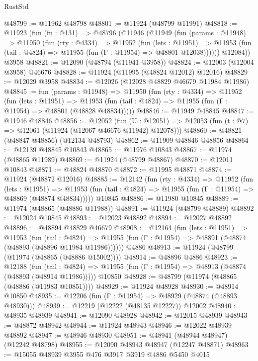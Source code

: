 \begin{lexlean}{RustStd}
\begin{coremodule}
{\begin{coremodule}
{{{{{{{{{{{{{{{{{{{{{{{{{{{{{{{{{{{{{{{{{{{{{{{{{{{{{{{{{{{{{{{{{{{{{{{{{{{{{{{{@48799 := @11962 @48798
@48801 := @11924 (@48799 @11991)
@48818 := @11923
    (fun (fn : @131) =>
    @48796
      (@11946
        (@11949
          (fun (params : @11948) =>
          @11950
            (fun (rty : @4334) =>
            @11952
              (fun (lets : @11951) =>
              @11953 (fun (tail : @4824) => @11955 (fun (Γ : @11954) => @48801 @12038))))))
        @12084))
    @3958
@48821 := @12090 (@48794 (@11941 @3958))
@48824 := @12003 (@12004 @3958) @46676
@48828 := @11924 (@11995 (@48824 @12012) @12016)
@48829 := @12029 @3958
@48834 := @12026 (@12028 @48829 @46679 @11984 @11986)
@48845 := fun (params : @11948) =>
  @11950
    (fun (rty : @4334) =>
    @11952
      (fun (lets : @11951) =>
      @11953 (fun (tail : @4824) => @11955 (fun (Γ : @11954) => @48801 (@48828 @48834)))))
@48846 := @11949 @48845
@48847 := @11946 @48846
@48856 := @12052
    (fun (U : @12051) => @12053 (fun (t : @7) => @12061 (@11924 (@12067 @46676 @11942) @12078)))
@48860 := @48821 (@48847 @48856) (@12134 @48793)
@48862 := @11909 @48846 @48856
@48864 := @12139 @48845 @10843
@48865 := @11976 @10843
@48867 := @11974 (@48865 @11989)
@48869 := @11924 (@48799 @48867)
@48870 := @12011 @10843
@48871 := @48824 @48870
@48872 := @11995 @48871
@48874 := @11924 (@48872 @12016)
@48885 := @12142
    (fun (rty : @4334) =>
    @11952
      (fun (lets : @11951) =>
      @11953 (fun (tail : @4824) => @11955 (fun (Γ : @11954) => @48869 (@48874 @48834)))))
    @10845
@48886 := @11980 @10845
@48889 := @11974 (@48865 (@48886 @11988))
@48891 := @11924 (@48799 @48889)
@48892 := @12024 @10845
@48893 := @12023 @48892
@48894 := @12027 @48892
@48896 := @48894 @48829 @46679
@48908 := @12164
    (fun (lets : @11951) =>
    @11953
      (fun (tail : @4824) =>
      @11955 (fun (Γ : @11954) => @48891 (@48874 (@48893 (@48896 @11984 @11986))))))
    @4886
@48913 := @11924 (@48799 (@11974 (@48865 (@48886 @15002))))
@48914 := @48896 @4886
@48923 := @12188
    (fun (tail : @4824) => @11955 (fun (Γ : @11954) => @48913 (@48874 (@48893 (@48914 @11986)))))
    @10850
@48928 := @48799 (@11974 (@48865 (@48886 (@11983 @10851))))
@48929 := @11924 @48928
@48930 := @48914 @10850
@48935 := @12206 (fun (Γ : @11954) => @48929 (@48874 (@48893 @48930)))
@48939 := @12219 (@12222 (@48135 @12227)) @12002
@48940 := @48935 @48939
@48941 := @12090 @48928
@48942 := @12015 @48939
@48943 := @48872 @48942
@48944 := @11924 @48943
@48946 := @12022 @48939 @48892
@48947 := @48946 @48930
@48951 := @48941 (@48944 @48947) (@12242 @48798)
@48955 := @12090 @48943 @48947 (@12247 @48871)
@48963 := @15055 @48939 @3955 @476 @3917 @3919 @4886 @5450 @4015
}}}}}}}}}}}}}}}}}}}}}}}}}}}}}}}}}}}}}}}}}}}}}}}}}}}}}}}}}}}}}}}}}}}}}}}}}}}}}}}}
\end{coremodule}}
\end{coremodule}
\end{lexlean}
